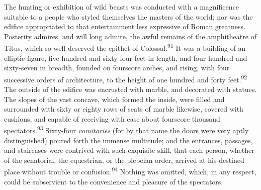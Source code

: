 





The hunting or exhibition of wild beasts was conducted with a
magnificence suitable to a people who styled themselves the
masters of the world; nor was the edifice appropriated to that
entertainment less expressive of Roman greatness. Posterity
admires, and will long admire, the awful remains of the
amphitheatre of Titus, which so well deserved the epithet of
Colossal.\textsuperscript{91} It was a building of an elliptic figure, five
hundred and sixty-four feet in length, and four hundred and
sixty-seven in breadth, founded on fourscore arches, and rising,
with four successive orders of architecture, to the height of one
hundred and forty feet.\textsuperscript{92} The outside of the edifice was
encrusted with marble, and decorated with statues. The slopes of
the vast concave, which formed the inside, were filled and
surrounded with sixty or eighty rows of seats of marble likewise,
covered with cushions, and capable of receiving with ease about
fourscore thousand spectators.\textsuperscript{93} Sixty-four \textit{vomitories} (for by
that name the doors were very aptly distinguished) poured forth
the immense multitude; and the entrances, passages, and
staircases were contrived with such exquisite skill, that each
person, whether of the senatorial, the equestrian, or the
plebeian order, arrived at his destined place without trouble or
confusion.\textsuperscript{94} Nothing was omitted, which, in any respect, could
be subservient to the convenience and pleasure of the spectators.

